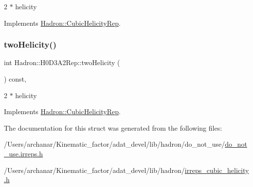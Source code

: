 2 $\ast$ helicity 

Implements \mbox{\hyperlink{structHadron_1_1CubicHelicityRep_af507aa56fc2747eacc8cb6c96db31ecc}{Hadron\+::\+Cubic\+Helicity\+Rep}}.

\mbox{\label{structHadron_1_1H0D3A2Rep_a1e84c338f1fbedd7277f543926c976d6}} 
\subsubsection{\texorpdfstring{twoHelicity()}{twoHelicity()}\hspace{0.1cm}{\footnotesize\ttfamily [2/2]}}
{\footnotesize\ttfamily int Hadron\+::\+H0\+D3\+A2\+Rep\+::two\+Helicity (\begin{DoxyParamCaption}{ }\end{DoxyParamCaption}) const\hspace{0.3cm}{\ttfamily [inline]}, {\ttfamily [virtual]}}

2 $\ast$ helicity 

Implements \mbox{\hyperlink{structHadron_1_1CubicHelicityRep_af507aa56fc2747eacc8cb6c96db31ecc}{Hadron\+::\+Cubic\+Helicity\+Rep}}.



The documentation for this struct was generated from the following files\+:\begin{DoxyCompactItemize}
\item 
/\+Users/archanar/\+Kinematic\+\_\+factor/adat\+\_\+devel/lib/hadron/do\+\_\+not\+\_\+use/\mbox{\hyperlink{do__not__use_8irreps_8h}{do\+\_\+not\+\_\+use.\+irreps.\+h}}\item 
/\+Users/archanar/\+Kinematic\+\_\+factor/adat\+\_\+devel/lib/hadron/\mbox{\hyperlink{lib_2hadron_2irreps__cubic__helicity_8h}{irreps\+\_\+cubic\+\_\+helicity.\+h}}\end{DoxyCompactItemize}
